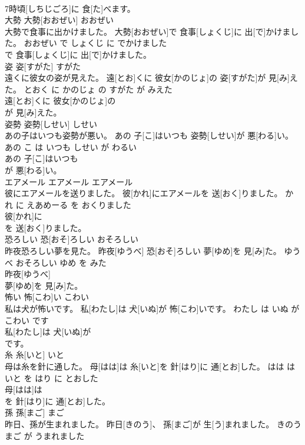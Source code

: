 \documentclass[8pt]{extreport}
\begin{document}
\begin{CJK}{UTF8}{min}
\\	7時頃[しちじごろ]に 食[た]べます。			
\\	大勢	大勢[おおぜい]	おおぜい	
\\	大勢で食事に出かけました。	大勢[おおぜい]で 食事[しょくじ]に 出[で]かけました。	おおぜい で しょくじ に でかけました	
\\	で 食事[しょくじ]に 出[で]かけました。			
\\	姿	姿[すがた]	すがた	
\\	遠くに彼女の姿が見えた。	遠[とお]くに 彼女[かのじょ]の 姿[すがた]が 見[み]えた。	とおく に かのじょ の すがた が みえた	
\\	遠[とお]くに 彼女[かのじょ]の
\\	が 見[み]えた。			
\\	姿勢	姿勢[しせい]	しせい	
\\	あの子はいつも姿勢が悪い。	あの 子[こ]はいつも 姿勢[しせい]が 悪[わる]い。	あの こ は いつも しせい が わるい	
\\	あの 子[こ]はいつも
\\	が 悪[わる]い。			
\\	エアメール	エアメール	エアメール	
\\	彼にエアメールを送りました。	彼[かれ]にエアメールを 送[おく]りました。	かれ に えあめーる を おくりました	
\\	彼[かれ]に
\\	を 送[おく]りました。			
\\	恐ろしい	恐[おそ]ろしい	おそろしい	
\\	昨夜恐ろしい夢を見た。	昨夜[ゆうべ] 恐[おそ]ろしい 夢[ゆめ]を 見[み]た。	ゆうべ おそろしい ゆめ を みた	
\\	昨夜[ゆうべ]
\\	夢[ゆめ]を 見[み]た。			
\\	怖い	怖[こわ]い	こわい	
\\	私は犬が怖いです。	私[わたし]は 犬[いぬ]が 怖[こわ]いです。	わたし は いぬ が こわい です	
\\	私[わたし]は 犬[いぬ]が
\\	です。			
\\	糸	糸[いと]	いと	
\\	母は糸を針に通した。	母[はは]は 糸[いと]を 針[はり]に 通[とお]した。	はは は いと を はり に とおした	
\\	母[はは]は
\\	を 針[はり]に 通[とお]した。			
\\	孫	孫[まご]	まご	
\\	昨日、孫が生まれました。	昨日[きのう]、 孫[まご]が 生[う]まれました。	きのう まご が うまれました	

\end{CJK}
\end{document}
